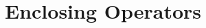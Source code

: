 %
%
%
%

\section{Enclosing Operators}

\begin{figure}[t]
\begin{center}
{ %
  \def\two#1#2{\begin{tabular}{c}#1\\#2\end{tabular}}
  \def\twoone#1{\two{\strut}{\raisebox{1.5ex}[0in][0in]{#1}}}
  \def\four#1#2#3#4{\begin{tabular}{c}#1\\#2\\#3\\#4\end{tabular}}
  \def\fourone#1{\four{\strut}{\strut}{\raisebox{1.5ex}[0in][0in]{#1}}{\strut}}

}
\end{center}
\end{figure}
